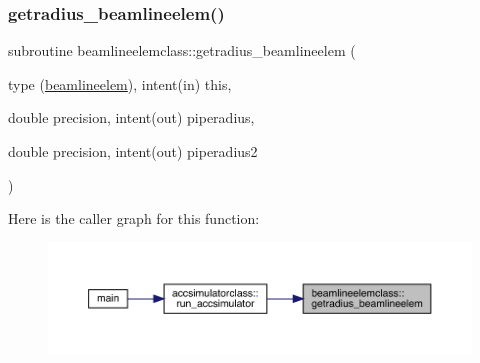 \mbox{\label{namespacebeamlineelemclass_aa3e3f73b38a31d67a955712c9706a2bd}} 
\subsubsection{\texorpdfstring{getradius\_beamlineelem()}{getradius\_beamlineelem()}}
{\footnotesize\ttfamily subroutine beamlineelemclass\+::getradius\+\_\+beamlineelem (\begin{DoxyParamCaption}\item[{type (\mbox{\hyperlink{namespacebeamlineelemclass_structbeamlineelemclass_1_1beamlineelem}{beamlineelem}}), intent(in)}]{this,  }\item[{double precision, intent(out)}]{piperadius,  }\item[{double precision, intent(out)}]{piperadius2 }\end{DoxyParamCaption})}

Here is the caller graph for this function\+:\nopagebreak
\begin{figure}[H]
\begin{center}
\leavevmode
\includegraphics[width=350pt]{namespacebeamlineelemclass_aa3e3f73b38a31d67a955712c9706a2bd_icgraph}
\end{center}
\end{figure}
\mbox{\label{namespacebeamlineelemclass_a76cac49c6e8615751de8c9f8bbba2641}} 
